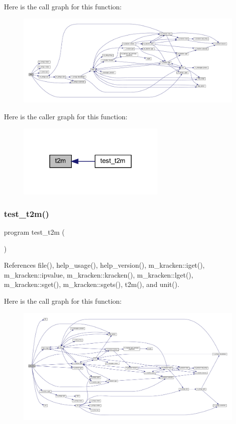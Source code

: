 Here is the call graph for this function\+:
\nopagebreak
\begin{figure}[H]
\begin{center}
\leavevmode
\includegraphics[width=350pt]{t2m_8f90_ab191ed2a41113781c7994c9642cfbbab_cgraph}
\end{center}
\end{figure}
Here is the caller graph for this function\+:
\nopagebreak
\begin{figure}[H]
\begin{center}
\leavevmode
\includegraphics[width=204pt]{t2m_8f90_ab191ed2a41113781c7994c9642cfbbab_icgraph}
\end{center}
\end{figure}
\mbox{\label{t2m_8f90_a1d0ef3619e5da531507fb99db2ebb4fe}} 
\subsubsection{\texorpdfstring{test\+\_\+t2m()}{test\_t2m()}}
{\footnotesize\ttfamily program test\+\_\+t2m (\begin{DoxyParamCaption}{ }\end{DoxyParamCaption})}



References file(), help\+\_\+usage(), help\+\_\+version(), m\+\_\+kracken\+::iget(), m\+\_\+kracken\+::ipvalue, m\+\_\+kracken\+::kracken(), m\+\_\+kracken\+::lget(), m\+\_\+kracken\+::sget(), m\+\_\+kracken\+::sgets(), t2m(), and unit().

Here is the call graph for this function\+:
\nopagebreak
\begin{figure}[H]
\begin{center}
\leavevmode
\includegraphics[width=350pt]{t2m_8f90_a1d0ef3619e5da531507fb99db2ebb4fe_cgraph}
\end{center}
\end{figure}
